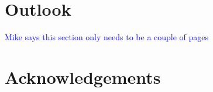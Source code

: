 \documentclass[
 aps,
 a4paper,
 superscriptaddress,
 notitlepage,
 nofootinbib,
 preprint %
]{revtex4-1}
\newcommand{\cm}[1]{\textcolor{blue}{#1}} %
\begin{document}
\section{Outlook}
\label{outlook}

\cm{Mike says this section only needs to be a couple of pages}



\section*{Acknowledgements}





\end{document}
